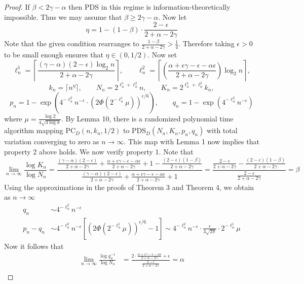 \documentclass[11pt]{article}
\begin{document}
\begin{proof}
If $\beta < 2\gamma - \alpha$ then PDS in this regime is information-theoretically impossible. Thus we may assume that $\beta \ge 2\gamma - \alpha$. Now let
$$\eta =1 - ( 1- \beta) \cdot \frac{2 - \epsilon}{2 + \alpha - 2\gamma}$$
Note that the given condition rearranges to $\frac{1 - \beta}{ 2+ \alpha - 2\gamma} > \frac{1}{4}$. Therefore taking $\epsilon > 0$ to be small enough ensures that $\eta \in (0, 1/2)$. Now set
$$\ell_n^1 = \left\lceil \frac{(\gamma - \alpha)(2 - \epsilon) \log_2 n}{2 + \alpha - 2\gamma} \right\rceil, \quad \quad \ell_n^2 = \left\lceil \left(\frac{\alpha + \epsilon \gamma - \epsilon - \alpha \epsilon}{2 + \alpha - 2\gamma} \right) \log_2 n \right\rceil,$$
$$k_n = \lceil n^{\eta} \rceil, \quad \quad N_n = 2^{\ell^1_n + \ell_n^2} n, \quad \quad K_n = 2^{\ell_n^1 + \ell_n^2} k_n,$$
$$p_n = 1 - \exp\left( 4^{-\ell_n^2} n^{-\epsilon} \cdot \left( 2\Phi\left( 2^{-\ell_n^1} \mu \right) \right)^{\epsilon/6} \right), \quad \quad q_n = 1 - \exp\left(4^{-\ell_n^2} n^{-\epsilon}\right)$$
where $\mu = \frac{\log 2}{4 \sqrt{3 \log k}}$. By Lemma 10, there is a randomized polynomial time algorithm mapping $\text{PC}_D(n, k_n, 1/2)$ to $\text{PDS}_D(N_n, K_n, p_n, q_n)$ with total variation converging to zero as $n \to \infty$. This map with Lemma 1 now implies that property 2 above holds. We now verify property 1. Note that
$$\lim_{n \to \infty} \frac{\log K_n}{\log N_n} = \frac{\frac{(\gamma - \alpha)(2 - \epsilon)}{2 + \alpha - 2\gamma} + \frac{\alpha + \epsilon \gamma - \epsilon - \alpha \epsilon}{2 + \alpha - 2\gamma} + 1 - \frac{(2 - \epsilon)(1 - \beta)}{2 + \alpha - 2\gamma}}{\frac{(\gamma - \alpha)(2 - \epsilon)}{2 + \alpha - 2\gamma} + \frac{\alpha + \epsilon \gamma - \epsilon - \alpha \epsilon}{2 + \alpha - 2\gamma} + 1} = \frac{\frac{2 - \epsilon}{2 + \alpha - 2\gamma} - \frac{(2 - \epsilon)(1 - \beta)}{2 + \alpha - 2\gamma}}{\frac{2 - \epsilon}{2 + \alpha - 2\gamma}} = \beta$$
Using the approximations in the proofs of Theorem 3 and Theorem 4, we obtain as $n \to \infty$
\begin{align*}
q_n &\sim 4^{-\ell_n^2} n^{-\epsilon} \\
p_n - q_n &\sim 4^{-\ell_n^2} n^{-\epsilon} \left[ \left( 2\Phi\left( 2^{-\ell_n^1} \mu \right) \right)^{\epsilon/6} - 1\right] \sim 4^{-\ell_n^2} n^{-\epsilon} \cdot \frac{\epsilon}{3 \sqrt{2\pi}} \cdot 2^{-\ell^1_n} \mu
\end{align*}
Now it follows that
\begin{align*}
\lim_{n \to \infty} \frac{\log q_n^{-1}}{\log N_n} &= \frac{2 \cdot \frac{\alpha + \epsilon \gamma - \epsilon - \alpha \epsilon}{2 + \alpha - 2\gamma} + \epsilon}{\frac{2 - \epsilon}{2 + \alpha - 2\gamma}} = \alpha \\

\end{align*}
\end{proof}
\end{document}
